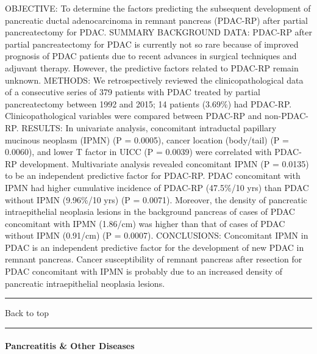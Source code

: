 \documentclass[]{article}
\let\oldparagraph\paragraph
\renewcommand{\paragraph}[1]{\oldparagraph{#1}\mbox{}}
\begin{document}
OBJECTIVE: To determine the factors predicting the subsequent
development of pancreatic ductal adenocarcinoma in remnant pancreas
(PDAC-RP) after partial pancreatectomy for PDAC. SUMMARY BACKGROUND
DATA: PDAC-RP after partial pancreatectomy for PDAC is currently not so
rare because of improved prognosis of PDAC patients due to recent
advances in surgical techniques and adjuvant therapy. However, the
predictive factors related to PDAC-RP remain unknown. METHODS: We
retrospectively reviewed the clinicopathological data of a consecutive
series of 379 patients with PDAC treated by partial pancreatectomy
between 1992 and 2015; 14 patients (3.69\%) had PDAC-RP.
Clinicopathological variables were compared between PDAC-RP and
non-PDAC-RP. RESULTS: In univariate analysis, concomitant intraductal
papillary mucinous neoplasm (IPMN) (P = 0.0005), cancer location
(body/tail) (P = 0.0060), and lower T factor in UICC (P = 0.0039) were
correlated with PDAC-RP development. Multivariate analysis revealed
concomitant IPMN (P = 0.0135) to be an independent predictive factor for
PDAC-RP. PDAC concomitant with IPMN had higher cumulative incidence of
PDAC-RP (47.5\%/10 yrs) than PDAC without IPMN (9.96\%/10 yrs) (P =
0.0071). Moreover, the density of pancreatic intraepithelial neoplasia
lesions in the background pancreas of cases of PDAC concomitant with
IPMN (1.86/cm) was higher than that of cases of PDAC without IPMN
(0.91/cm) (P = 0.0007). CONCLUSIONS: Concomitant IPMN in PDAC is an
independent predictive factor for the development of new PDAC in remnant
pancreas. Cancer susceptibility of remnant pancreas after resection for
PDAC concomitant with IPMN is probably due to an increased density of
pancreatic intraepithelial neoplasia lesions.

{}

{}

\begin{center}\rule{0.5\linewidth}{\linethickness}\end{center}

Back to top

\begin{center}\rule{0.5\linewidth}{\linethickness}\end{center}

\pagebreak

\hypertarget{pancreatitis-other-diseases}{%
\paragraph{Pancreatitis \& Other
Diseases}\label{pancreatitis-other-diseases}}
\end{document}
